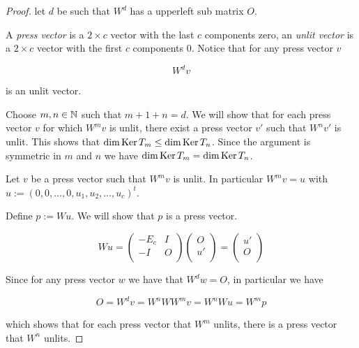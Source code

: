 \begin{proof}
  let $d$ be such that $W^d$ has a upperleft sub matrix $O$.

  A \emph{press vector} is a $2\times c$ vector with the last $c$ components zero, an \emph{unlit vector} is a $2\times c$ vector with the first $c$ components 0. Notice that for any press vector $v$

  \[
    W^d v
  \]

  is an unlit vector.

  Choose $m,n\in\mathbb{N}$ such that $m + 1 + n = d$. We will show that for each press vector $v$ for which $W^m v$ is unlit, there exist a press vector $v'$ such that $W^n v'$ is unlit.
  This shows that $\dim\operatorname{Ker} T_{m} \leq \dim\operatorname{Ker} T_{n}$. Since the argument is symmetric in $m$ and $n$ we have $\dim\operatorname{Ker} T_{m} = \dim\operatorname{Ker} T_{n}$.

  Let $v$ be a press vector such that $W^{m} v$ is unlit. In particular $W^{m} v = u$ with $u := (0,0,\ldots, 0, u_{1}, u_{2}, \ldots, u_{c})^t$.

  Define $p := W u$. We will show that $p$ is a press vector.

  \[
    W u = \left(
    \begin{array}{cc}
      -E_{c} & I \\
      -I    & O \\
    \end{array}
    \right)
    \left(
    \begin{array}{c}
      O  \\
      u' \\
    \end{array}
    \right)
    =
    \left(
    \begin{array}{c}
      u' \\
      O  \\
    \end{array}
    \right)
  \]

  Since for any press vector $w$ we have that $W^{d} w = O$, in particular we have

  \[
  O = W^{d} v = W^{n} W W^{m} v = W^{n} W u = W^{m} p
  \]

  which shows that for each press vector that $W^{m}$ unlits, there is a press vector that $W^{n}$ unlits.
\end{proof}
